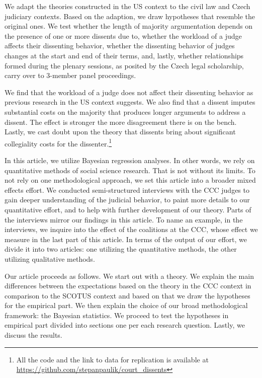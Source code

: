 \documentclass[
  11pt,
]{article}
\begin{document}
We adapt the theories constructed in the US context to the civil law and
Czech judiciary contexts. Based on the adaption, we draw hypotheses that
resemble the original ones. We test whether the length of majority
argumentation depends on the presence of one or more dissents due to,
whether the workload of a judge affects their dissenting behavior,
whether the dissenting behavior of judges changes at the start and end
of their terms, and, lastly, whether relationships formed during the
plenary sessions, as posited by the Czech legal scholarship, carry over
to 3-member panel proceedings.

We find that the workload of a judge does not affect their dissenting
behavior as previous research in the US context suggests. We also find
that a dissent imputes substantial costs on the majority that produces
longer arguments to address a dissent. The effect is stronger the more
disagreement there is on the bench. Lastly, we cast doubt upon the
theory that dissents bring about significant collegiality costs for the
dissenter.\footnote{All the code and the link to data for replication is
  available at \url{https://github.com/stepanpaulik/court_dissents}}

In this article, we utilize Bayesian regression analyses. In other
words, we rely on quantitative methods of social science research. That
is not without its limits. To not rely on one methodological approach,
we set this article into a broader mixed effects effort. We conducted
semi-structured interviews with the CCC judges to gain deeper
understanding of the judicial behavior, to paint more details to our
quantitative effort, and to help with further development of our theory.
Parts of the interviews mirror our findings in this article. To name an
example, in the interviews, we inquire into the effect of the coalitions
at the CCC, whose effect we measure in the last part of this article. In
terms of the output of our effort, we divide it into two articles: one
utilizing the quantitative methods, the other utilizing qualitative
methods.

Our article proceeds as follows. We start out with a theory. We explain
the main differences between the expectations based on the theory in the
CCC context in comparison to the SCOTUS context and based on that we
draw the hypotheses for the empirical part. We then explain the choice
of our broad methodological framework: the Bayesian statistics. We
proceed to test the hypotheses in empirical part divided into sections
one per each research question. Lastly, we discuss the results.
\end{document}
